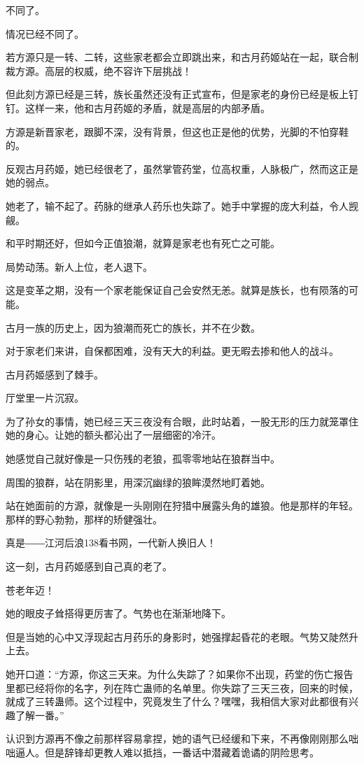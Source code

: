 \begin{this_body}
不同了。

情况已经不同了。

若方源只是一转、二转，这些家老都会立即跳出来，和古月药姬站在一起，联合制裁方源。高层的权威，绝不容许下层挑战！

但此刻方源已经是三转，族长虽然还没有正式宣布，但是家老的身份已经是板上钉钉。这样一来，他和古月药姬的矛盾，就是高层的内部矛盾。

方源是新晋家老，跟脚不深，没有背景，但这也正是他的优势，光脚的不怕穿鞋的。

反观古月药姬，她已经很老了，虽然掌管药堂，位高权重，人脉极广，然而这正是她的弱点。

她老了，输不起了。药脉的继承人药乐也失踪了。她手中掌握的庞大利益，令人觊觎。

和平时期还好，但如今正值狼潮，就算是家老也有死亡之可能。

局势动荡。新人上位，老人退下。

这是变革之期，没有一个家老能保证自己会安然无恙。就算是族长，也有陨落的可能。

古月一族的历史上，因为狼潮而死亡的族长，并不在少数。

对于家老们来讲，自保都困难，没有天大的利益。更无暇去掺和他人的战斗。

古月药姬感到了棘手。

厅堂里一片沉寂。

为了孙女的事情，她已经三天三夜没有合眼，此时站着，一股无形的压力就笼罩住她的身心。让她的额头都沁出了一层细密的冷汗。

她感觉自己就好像是一只伤残的老狼，孤零零地站在狼群当中。

周围的狼群，站在阴影里，用深沉幽绿的狼眸漠然地盯着她。

站在她面前的方源，就像是一头刚刚在狩猎中展露头角的雄狼。他是那样的年轻。那样的野心勃勃，那样的矫健强壮。

真是――江河后浪138看书网，一代新人换旧人！

这一刻，古月药姬感到自己真的老了。

苍老年迈！

她的眼皮子耸搭得更厉害了。气势也在渐渐地降下。

但是当她的心中又浮现起古月药乐的身影时，她强撑起昏花的老眼。气势又陡然升上去。

她开口道：“方源，你这三天来。为什么失踪了？如果你不出现，药堂的伤亡报告里都已经将你的名字，列在阵亡蛊师的名单里。你失踪了三天三夜，回来的时候，就成了三转蛊师。这个过程中，究竟发生了什么？嘿嘿，我相信大家对此都很有兴趣了解一番。”

认识到方源再不像之前那样容易拿捏，她的语气已经缓和下来，不再像刚刚那么咄咄逼人。但是辞锋却更教人难以抵挡，一番话中潜藏着诡谲的阴险思考。


\end{this_body}
